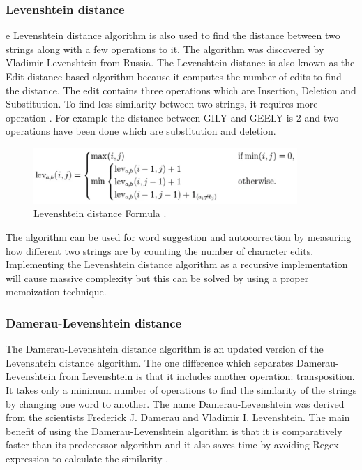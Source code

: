 \subsubsection{Levenshtein distance}
e Levenshtein distance algorithm is also used to find the distance between two strings along with a few operations to it. The algorithm was discovered by Vladimir Levenshtein from Russia. The Levenshtein distance is also known as the Edit-distance based algorithm because it computes the number of edits to find the distance. The edit contains three operations which are Insertion, Deletion and Substitution. To find less similarity between two strings, it requires more operation \cite{ChSa2019}. For example the distance between GILY and GEELY is 2 and two operations have been done which are substitution and deletion.

\begin{figure}[h!]
	\includegraphics[width=10cm]{includes/levdist.png}
	\centering
	\caption{ Levenshtein distance Formula \cite{Cuelogic}.}
	\label{fig:levdist}
\end{figure}
The algorithm can be used for word suggestion and autocorrection by measuring how different two strings are by counting the number of character edits. Implementing the Levenshtein distance algorithm as a recursive implementation will cause massive complexity but this can be solved by using a proper memoization technique.

\subsubsection{Damerau-Levenshtein distance}
The Damerau-Levenshtein distance algorithm is an updated version of the Levenshtein distance algorithm. The one difference which separates  Damerau-Levenshtein from Levenshtein is that it includes another operation: transposition. It takes only a minimum number of operations to find the similarity of the strings by changing one word to another. The name Damerau-Levenshtein was derived from the scientists Frederick J. Damerau and Vladimir I. Levenshtein. The main benefit of using the Damerau-Levenshtein algorithm is that it is comparatively faster than its predecessor algorithm and it also saves time by avoiding Regex expression to calculate the similarity \cite{ChSa2019}. 


